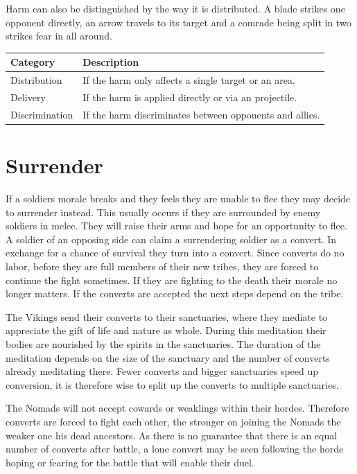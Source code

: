 Harm can also be distinguished by the way it is distributed. A blade strikes
one opponent directly, an arrow travels to its target and a comrade being split
in two strikes fear in all around.

\begin{longtable}{ll}
	\toprule
	Category       & Description                                             \\
	\midrule
	Distribution   & If the harm only affects a single target or an area.    \\
	Delivery       & If the harm is applied directly or via an projectile.   \\
	Discrimination & If the harm discriminates between opponents and allies. \\
	\bottomrule
\end{longtable}


\section{Surrender}\label{ch:Conflict:Surrender}

If a soldiers morale breaks and they feels
they are unable to flee they may decide to surrender instead.
This usually occurs if they are surrounded by enemy soldiers in melee.
They will raise their arms and hope for an opportunity to flee.
A soldier of an opposing side can claim a surrendering soldier as a convert.
In exchange for a chance of survival they turn into a convert.
Since converts do no labor, before they are full members of their new tribes,
they are forced to continue the fight sometimes.
If they are fighting to the death their morale no longer matters.
If the converts are accepted the next steps depend on the tribe.

The \gls{Vikings} send their converts to their sanctuaries,
where they mediate to appreciate the gift of life and nature as whole.
During this meditation their bodies are nourished by the spirits in the sanctuaries.
The duration of the meditation depends on the size of the sanctuary
and the number of converts already meditating there.
Fewer converts and bigger sanctuaries speed up conversion,
it is therefore wise to split up the converts to multiple sanctuaries.

The \gls{Nomads} will not accept cowards or weaklings within their hordes.
Therefore converts are forced to fight each other,
the stronger on joining the \gls{Nomads} the weaker one his dead ancestors.
As there is no guarantee that there is an equal number of converts after battle,
a lone convert may be seen following the horde hoping or fearing for the battle that will
enable their duel.

